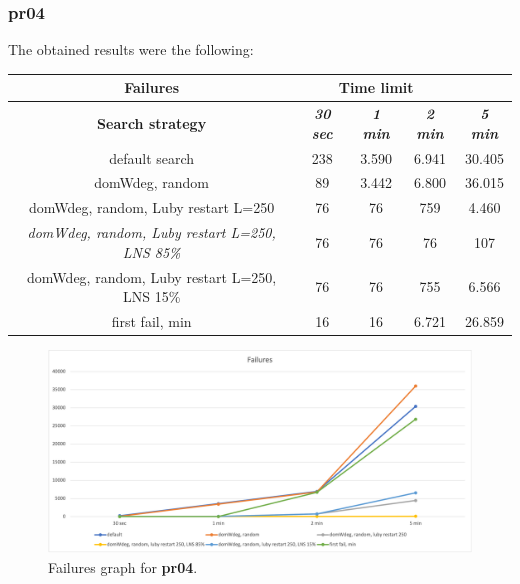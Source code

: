 \subsubsection{pr04}
\label{subsubsec:pr04}
The obtained results were the following:
{
\renewcommand{\arraystretch}{2}
\begin{longtable}[h]{| c | c | c | c | c |}
    \hline
    \textbf{Failures} & \multicolumn{3}{c}{Time limit} & \\
    \hline
    \textbf{Search strategy} & \textbf{\textit{30 sec}} & \textbf{\textit{1 min}} & \textbf{\textit{2 min}} & \textbf{\textit{5 min}} \\
    \hline
    \endhead
    default search                                         & 238 &  3.590 &  6.941 &  30.405 \\
    \hline
    domWdeg, random                                        &  89 &  3.442 &  6.800 &  36.015 \\
    \hline
    domWdeg, random, Luby restart L=250                    &  76 &    76 &   759 &   4.460 \\
    \hline
    \textit{domWdeg, random, Luby restart L=250, LNS 85\%} &  76 &    76 &    76 &    107 \\
    \hline
    domWdeg, random, Luby restart L=250, LNS 15\%          &  76 &    76 &   755 &   6.566 \\
    \hline
    first fail, min                                        &  16 &    16 &  6.721 &  26.859 \\
    \hline
\end{longtable}
}
\begin{figure}[H]
    \centering
    \includegraphics[width=0.8\columnwidth]{../graphs/pr04-failures.png}
    \caption{Failures graph for \textbf{pr04}.}
\end{figure}

